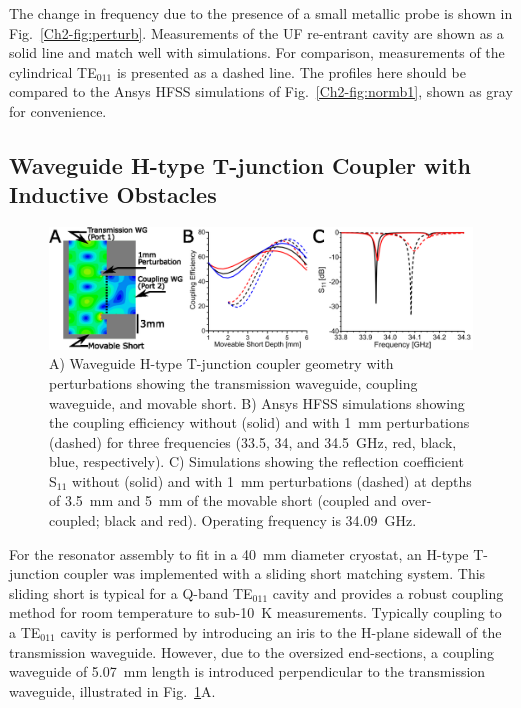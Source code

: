The change in frequency due to the presence of a small metallic probe is shown in Fig.~\ref{Ch2-fig:perturb}. Measurements of the UF re-entrant \cylTE{} cavity are shown as a solid line and match well with simulations. For comparison, measurements of the cylindrical TE$_{011}$ is presented as a dashed line. The profiles here should be compared to the Ansys HFSS simulations of Fig.~\ref{Ch2-fig:normb1}, shown as gray for convenience. 


\subsection{Waveguide H-type T-junction Coupler with Inductive Obstacles}
\begin{figure}[htb]\centering
 \includegraphics[width=\textwidth]{Kapitel/Ch2-Images/04-CouplingPert.eps}
 \caption[Waveguide H-type T-junction coupler geometry.]{A) Waveguide H-type T-junction coupler geometry with perturbations showing the transmission waveguide, coupling waveguide, and movable short. B) Ansys HFSS simulations showing the coupling efficiency without (solid) and with 1~mm perturbations (dashed) for three frequencies (33.5, 34, and 34.5~GHz, red, black, blue, respectively). C) Simulations showing the reflection coefficient S$_{\text{11}}$ without (solid) and with 1~mm perturbations (dashed) at depths of 3.5~mm and 5~mm of the movable short (coupled and over-coupled; black and red). Operating frequency is 34.09~GHz.}
 \label{Ch2-fig:waveguide}
\end{figure}

For the resonator assembly to fit in a 40~mm diameter cryostat, an H-type T-junction coupler was implemented with a sliding short matching system. This sliding short is typical for a Q-band TE$_{011}$ cavity and provides a robust coupling method for room temperature to sub-10~K measurements. \cite{generalte011} Typically coupling to a TE$_{011}$ cavity is performed by introducing an iris to the H-plane sidewall of the transmission waveguide. However, due to the oversized end-sections, a coupling waveguide of 5.07~mm length is introduced perpendicular to the transmission waveguide, illustrated in Fig.~\ref{Ch2-fig:waveguide}A. 

